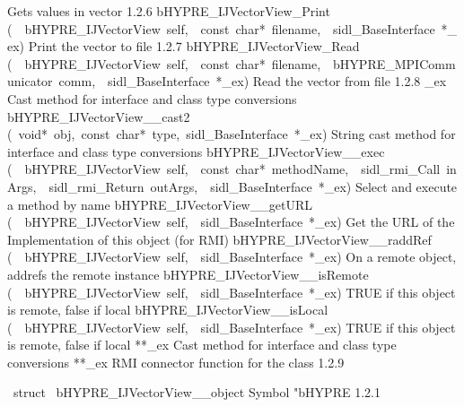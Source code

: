 \documentclass{article}
\begin{document}
\begin{cxxentry}
\begin{cxxentry}
\begin{cxxnames}
        {
Gets values in vector}
        {1.2.6}
        {bHYPRE\_IJVectorView\_Print}
        {(\ \ bHYPRE\_IJVectorView\ self,\ \ const\ char*\ filename,\ \ sidl\_BaseInterface\ *\_ex)}
        {
Print the vector to file}
        {1.2.7}
        {bHYPRE\_IJVectorView\_Read}
        {(\ \ bHYPRE\_IJVectorView\ self,\ \ const\ char*\ filename,\ \ bHYPRE\_MPICommunicator\ comm,\ \ sidl\_BaseInterface\ *\_ex)}
        {
Read the vector from file}
        {1.2.8}
        {\_ex}
        {}
        {
Cast method for interface and class type conversions}
        {}
\label{cxx.1.2.11}
        {bHYPRE\_IJVectorView\_\_cast2}
        {(\ void*\ obj,\ const\ char*\ type,\ sidl\_BaseInterface\ *\_ex)}
        {
String cast method for interface and class type conversions}
        {}
\label{cxx.1.2.12}
        {bHYPRE\_IJVectorView\_\_exec}
        {(\ \ bHYPRE\_IJVectorView\ self,\ \ const\ char*\ methodName,\ \ sidl\_rmi\_Call\ inArgs,\ \ sidl\_rmi\_Return\ outArgs,\ \ sidl\_BaseInterface\ *\_ex)}
        {
Select and execute a method by name}
        {}
\label{cxx.1.2.13}
        {bHYPRE\_IJVectorView\_\_getURL}
        {(\ \ bHYPRE\_IJVectorView\ self,\ \ sidl\_BaseInterface\ *\_ex)}
        {
Get the URL of the Implementation of this object (for RMI)}
        {}
\label{cxx.1.2.14}
        {bHYPRE\_IJVectorView\_\_raddRef}
        {(\ \ bHYPRE\_IJVectorView\ self,\ \ sidl\_BaseInterface\ *\_ex)}
        {
On a remote object, addrefs the remote instance}
        {}
\label{cxx.1.2.15}
        {bHYPRE\_IJVectorView\_\_isRemote}
        {(\ \ bHYPRE\_IJVectorView\ self,\ \ sidl\_BaseInterface\ *\_ex)}
        {
TRUE if this object is remote, false if local}
        {}
\label{cxx.1.2.16}
        {bHYPRE\_IJVectorView\_\_isLocal}
        {(\ \ bHYPRE\_IJVectorView\ self,\ \ sidl\_BaseInterface\ *\_ex)}
        {
TRUE if this object is remote, false if local}
        {}
\label{cxx.1.2.17}
        {**\_ex}
        {}
        {
Cast method for interface and class type conversions}
        {}
\label{cxx.1.2.18}
        {**\_ex}
        {}
        {
RMI connector function for the class}
        {1.2.9}
\end{cxxnames}
\begin{cxxvariable}
{\ struct\ }
        {bHYPRE\_IJVectorView\_\_object}
        {}
        {
Symbol "bHYPRE}
        {1.2.1}
\begin{cxxdoc}


\end{cxxdoc}
\end{cxxvariable}
\end{cxxentry}
\end{cxxentry}
\end{document}
